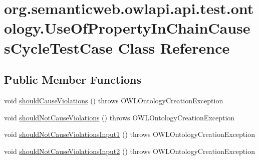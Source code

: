 \hypertarget{classorg_1_1semanticweb_1_1owlapi_1_1api_1_1test_1_1ontology_1_1_use_of_property_in_chain_causes_cycle_test_case}{\section{org.\-semanticweb.\-owlapi.\-api.\-test.\-ontology.\-Use\-Of\-Property\-In\-Chain\-Causes\-Cycle\-Test\-Case Class Reference}
\label{classorg_1_1semanticweb_1_1owlapi_1_1api_1_1test_1_1ontology_1_1_use_of_property_in_chain_causes_cycle_test_case}
}
\subsection*{Public Member Functions}
\begin{DoxyCompactItemize}
\item 
void \hyperlink{classorg_1_1semanticweb_1_1owlapi_1_1api_1_1test_1_1ontology_1_1_use_of_property_in_chain_causes_cycle_test_case_abb94e134d0030d544ff8959210504f47}{should\-Cause\-Violations} ()  throws O\-W\-L\-Ontology\-Creation\-Exception 
\item 
void \hyperlink{classorg_1_1semanticweb_1_1owlapi_1_1api_1_1test_1_1ontology_1_1_use_of_property_in_chain_causes_cycle_test_case_a05a9b198137bbe07c9b31e77f961dc5e}{should\-Not\-Cause\-Violations} ()  throws O\-W\-L\-Ontology\-Creation\-Exception 
\item 
void \hyperlink{classorg_1_1semanticweb_1_1owlapi_1_1api_1_1test_1_1ontology_1_1_use_of_property_in_chain_causes_cycle_test_case_a4b96bc9c2e729eecb9844a0187c2a851}{should\-Not\-Cause\-Violations\-Input1} ()  throws O\-W\-L\-Ontology\-Creation\-Exception 
\item 
void \hyperlink{classorg_1_1semanticweb_1_1owlapi_1_1api_1_1test_1_1ontology_1_1_use_of_property_in_chain_causes_cycle_test_case_a0d07b1847235aa355c321f3c3d0decce}{should\-Not\-Cause\-Violations\-Input2} ()  throws O\-W\-L\-Ontology\-Creation\-Exception 
\end{DoxyCompactItemize}


